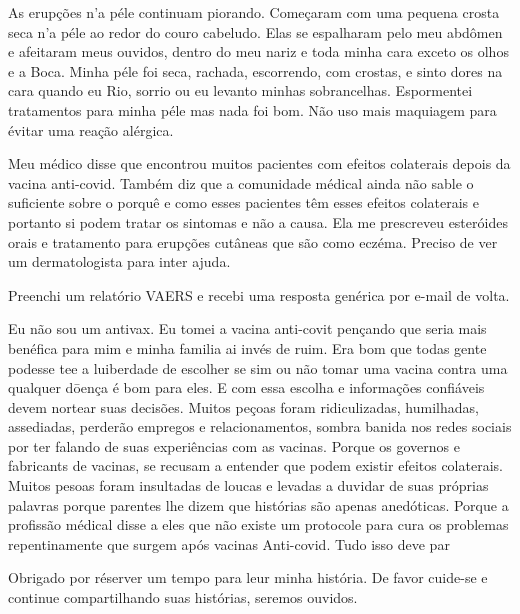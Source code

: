 As erupções n'a péle continuam piorando. Começaram com uma pequena crosta seca
n'a péle ao redor do couro cabeludo. Elas se espalharam pelo meu abdômen e
afeitaram meus ouvidos, dentro do meu nariz e toda minha cara exceto os olhos e
a Boca. Minha péle foi seca, rachada, escorrendo, com crostas, e sinto dores na
cara quando eu Rio, sorrio ou eu levanto minhas sobrancelhas. Espormentei
tratamentos para minha péle mas nada foi bom. Não uso mais maquiagem para évitar
uma reação alérgica.

Meu médico disse que encontrou muitos pacientes com efeitos colaterais depois da
vacina anti-covid. Também diz que a comunidade médical ainda não sable o
suficiente sobre o porquê e como esses pacientes têm esses efeitos colaterais e
portanto si podem tratar os sintomas e não a causa. Ela me prescreveu esteróides
orais e tratamento para erupções cutâneas que são como eczéma. Preciso de ver um
dermatologista para inter ajuda.

Preenchi um relatório VAERS e recebi uma resposta genérica por e-mail de volta.

Eu não sou um antivax. Eu tomei a vacina anti-covit pençando que seria mais
benéfica para mim e minha familia ai invés de ruim. Era bom que todas gente
podesse tee a luiberdade de escolher se sim ou não tomar uma vacina contra uma
qualquer dōença é bom para eles. E com essa escolha e informações confiáveis
devem nortear suas decisões. Muitos peçoas foram ridiculizadas, humilhadas,
assediadas, perderão empregos e relacionamentos, sombra banida nos redes sociais
por ter falando de suas experiências com as vacinas. Porque os governos e
fabricants de vacinas, se recusam a entender que podem existir efeitos
colaterais. Muitos pesoas foram insultadas de loucas e levadas a duvidar de suas
próprias palavras porque parentes lhe dizem que histórias são apenas
anedóticas. Porque a profissão médical disse a eles que não existe um protocole
para cura os problemas repentinamente que surgem após vacinas Anti-covid. Tudo
isso deve par

Obrigado por réserver um tempo para leur minha história. De favor cuide-se e
continue compartilhando suas histórias, seremos ouvidos.
